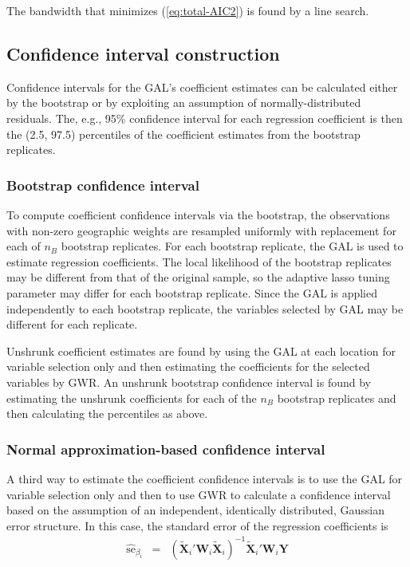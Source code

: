 \documentclass[authoryear, review, 11pt]{elsarticle}
\begin{document}
	The bandwidth that minimizes (\ref{eq:total-AIC2}) is found by a line search.\\
	
	\subsection{Confidence interval construction}	
	Confidence intervals for the GAL's coefficient estimates can be calculated either by the bootstrap \citep{Efron:1986} or by exploiting an assumption of normally-distributed residuals. The, e.g., 95\% confidence interval for each regression coefficient is then the (2.5, 97.5) percentiles of the coefficient estimates from the bootstrap replicates.\\
	 
	 	\subsubsection{Bootstrap confidence interval}
		To compute coefficient confidence intervals via the bootstrap, the observations with non-zero geographic weights are resampled uniformly with replacement for each of $n_B$ bootstrap replicates. For each bootstrap replicate, the GAL is used to estimate regression coefficients. The local likelihood of the bootstrap replicates may be different from that of the original sample, so the adaptive lasso tuning parameter may differ for each bootstrap replicate. Since the GAL is applied independently to each bootstrap replicate, the variables selected by GAL may be different for each replicate.
	
		 Unshrunk coefficient estimates are found by using the GAL at each location for variable selection only and then estimating the coefficients for the selected variables by GWR. An unshrunk bootstrap confidence interval is found by estimating the unshrunk coefficients for each of the $n_B$ bootstrap replicates and then calculating the percentiles as above.\\
	 
		
	 	\subsubsection{Normal approximation-based confidence interval}
		A third way to estimate the coefficient confidence intervals is to use the GAL for variable selection only and then to use GWR to calculate a confidence interval based on the assumption of an independent, identically distributed, Gaussian error structure. In this case, the standard error of the regression coefficients is 
		\begin{eqnarray}
			\hat{\mbox{se}}_{\beta_i} &=& \left( \tilde{\bm{X}}_i'\bm{W}_i \tilde{\bm{X}}_i \right)^{-1}  \tilde{\bm{X}}_i'\bm{W}_i\bm{Y}
		\end{eqnarray}
	
\end{document}
